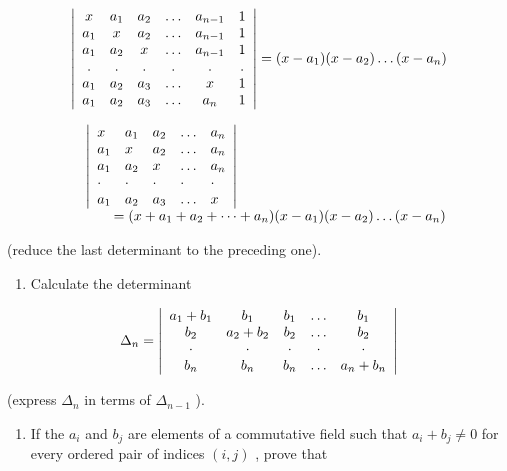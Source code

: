 \[
\left| \begin{array}{c c c c c c} x & a _ {1} & a _ {2} & \ldots & a _ {n - 1} & 1 \\ a _ {1} & x & a _ {2} & \ldots & a _ {n - 1} & 1 \\ a _ {1} & a _ {2} & x & \ldots & a _ {n - 1} & 1 \\ . & . & . & . & . & . \\ a _ {1} & a _ {2} & a _ {3} & \ldots & x & 1 \\ a _ {1} & a _ {2} & a _ {3} & \ldots & a _ {n} & 1 \end{array} \right| = (x - a _ {1}) (x - a _ {2}) \ldots (x - a _ {n})
\]

\[
\begin{array}{r l} & {\left| \begin{array}{l l l l l} x & a _ {1} & a _ {2} & \ldots & a _ {n} \\ a _ {1} & x & a _ {2} & \ldots & a _ {n} \\ a _ {1} & a _ {2} & x & \ldots & a _ {n} \\ \cdot & \cdot & \cdot & \cdot & \cdot \\ a _ {1} & a _ {2} & a _ {3} & \ldots & x \end{array} \right|} \\ & {\qquad = (x + a _ {1} + a _ {2} + \dots + a _ {n}) (x - a _ {1}) (x - a _ {2}) \ldots (x - a _ {n})} \end{array}
\]

(reduce the last determinant to the preceding one).

\begin{enumerate}
\def\labelenumi{\arabic{enumi}.}
\setcounter{enumi}{3}
\tightlist
\item
  Calculate the determinant
\end{enumerate}

\[
\Delta_ {n} = \left| \begin{array}{c c c c c} a _ {1} + b _ {1} & b _ {1} & b _ {1} & \ldots & b _ {1} \\ b _ {2} & a _ {2} + b _ {2} & b _ {2} & \ldots & b _ {2} \\ \cdot & \cdot & \cdot & \cdot & \cdot \\ b _ {n} & b _ {n} & b _ {n} & \ldots & a _ {n} + b _ {n} \end{array} \right|
\]

(express \(\Delta_{n}\) in terms of \(\Delta_{n-1}\) ).

\begin{enumerate}
\def\labelenumi{\arabic{enumi}.}
\setcounter{enumi}{4}
\tightlist
\item
  If the \(a_i\) and \(b_j\) are elements of a commutative field such that \(a_i + b_j \neq 0\) for every ordered pair of indices \((i,j)\) , prove that
\end{enumerate}

